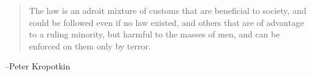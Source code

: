 \documentclass{exam}
\begin{document}
  \else
    \vspace{5 cm}
    \begin{quote}
      \begin{em}
        The law is an adroit mixture of customs that are beneficial to society, and could be followed even if no law existed, and others that are of
        advantage to a ruling minority, but harmful to the masses of men, and can be enforced on them only by terror.
      \end{em}
    \end{quote}

    \hspace{1 cm} --Peter Kropotkin
  \fi
\end{document}
